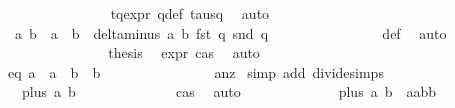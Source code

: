 \begin{isabellebody}
\ \ \ \ \ \ \ \ \ \ \ \ \ \ \isamarkupfalse%
\ tq{\isacharunderscore}expr\ q{\isacharunderscore}def\ tau{\isacharunderscore}sq\ \isamarkupfalse%
\ auto\isanewline
\ \ \ \ \ \ \ \ \ \ \ \ \isamarkupfalse%
\ \isamarkupfalse%
\ {\isachardoublequoteopen}{\isasymdelta}{\isacharprime}\ a{}\ b{}\ {\isacharequal}\ a{}\ {\isacharasterisk}\ b{}\ {\isacharasterisk}\ delta{\isacharunderscore}minus\ a{}\ b{}\ {\isacharparenleft}fst\ q{\isacharparenright}\ {\isacharparenleft}snd\ q{\isacharparenright}{\isachardoublequoteclose}\isanewline
\ \ \ \ \ \ \ \ \ \ \ \ \ \ \isamarkupfalse%
\ {\isasymdelta}{\isacharprime}{\isacharunderscore}def\ \isamarkupfalse%
\ auto\isanewline
\ \ \ \ \ \ \ \ \ \ \ \ \isamarkupfalse%
\ \isamarkupfalse%
\ {\isacharquery}thesis\ \isamarkupfalse%
\ {\isasymdelta}{\isacharprime}{\isacharunderscore}expr\ cas{}\ \isamarkupfalse%
\ auto\isanewline
\ \ \ \ \ \ \ \ \ \ \isamarkupfalse%
\isanewline
\ \ \ \ \ \ \ \ \ \ \isamarkupfalse%
\ \isamarkupfalse%
\ eq{}{\isacharcolon}\ {\isachardoublequoteopen}a{}\ {\isacharequal}\ a{}\ {\isacharasterisk}\ {\isacharparenleft}b{}\ {\isacharslash}\ b{}{\isacharparenright}{\isachardoublequoteclose}\ \ \isanewline
\ \ \ \ \ \ \ \ \ \ \ \ \isamarkupfalse%
\ a{}{\isacharunderscore}nz{\isacharparenleft}{}{\isacharparenright}\ \isamarkupfalse%
{\isacharparenleft}simp\ add{\isacharcolon}\ divide{\isacharunderscore}simps{\isacharparenright}\ \isanewline
\ \ \ \ \isanewline
\ \ \ \ \ \ \ \ \ \ \isamarkupfalse%
\ {\isachardoublequoteopen}{}\ {\isacharequal}\ {\isasymdelta}{\isacharunderscore}plus\ a{}\ b{}{\isachardoublequoteclose}\isanewline
\ \ \ \ \ \ \ \ \ \ \ \ \isamarkupfalse%
\ cas{}\ \isamarkupfalse%
\ auto\isanewline
\ \ \ \ \ \ \ \ \ \ \isamarkupfalse%
\ \isamarkupfalse%
\ {\isachardoublequoteopen}{\isasymdelta}{\isacharunderscore}plus\ a{}\ b{}\ {\isacharequal}\ {\isacharminus}a{}{\isacharasterisk}a{}{\isacharplus}b{}{\isacharasterisk}b{}{\isachardoublequoteclose}\isanewline
\ \ \ \ \ \ \ \ \ \ \ \ \isamarkupfalse%

\end{isabellebody}
